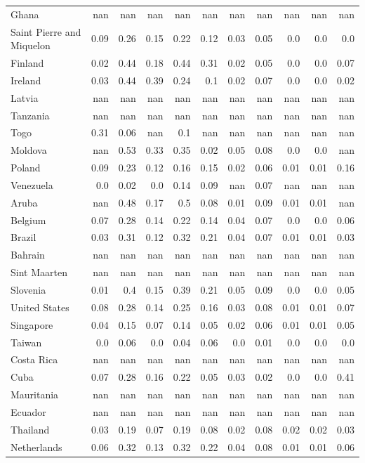 \documentclass[11pt]{article}
\begin{document}
\begin{center}
\begin{longtable}{|p{70pt}|r|r|r|r|r|r|r|r|r|r|}
Ghana& nan& nan& nan& nan& nan& nan& nan& nan& nan& nan\\
Saint Pierre and Miquelon& 0.09& 0.26& 0.15& 0.22& 0.12& 0.03& 0.05& 0.0& 0.0& 0.0\\
Finland& 0.02& 0.44& 0.18& 0.44& 0.31& 0.02& 0.05& 0.0& 0.0& 0.07\\
Ireland& 0.03& 0.44& 0.39& 0.24& 0.1& 0.02& 0.07& 0.0& 0.0& 0.02\\
Latvia& nan& nan& nan& nan& nan& nan& nan& nan& nan& nan\\
Tanzania& nan& nan& nan& nan& nan& nan& nan& nan& nan& nan\\
Togo& 0.31& 0.06& nan& 0.1& nan& nan& nan& nan& nan& nan\\
Moldova& nan& 0.53& 0.33& 0.35& 0.02& 0.05& 0.08& 0.0& 0.0& nan\\
Poland& 0.09& 0.23& 0.12& 0.16& 0.15& 0.02& 0.06& 0.01& 0.01& 0.16\\
Venezuela& 0.0& 0.02& 0.0& 0.14& 0.09& nan& 0.07& nan& nan& nan\\
Aruba& nan& 0.48& 0.17& 0.5& 0.08& 0.01& 0.09& 0.01& 0.01& nan\\
Belgium& 0.07& 0.28& 0.14& 0.22& 0.14& 0.04& 0.07& 0.0& 0.0& 0.06\\
Brazil& 0.03& 0.31& 0.12& 0.32& 0.21& 0.04& 0.07& 0.01& 0.01& 0.03\\
Bahrain& nan& nan& nan& nan& nan& nan& nan& nan& nan& nan\\
Sint Maarten& nan& nan& nan& nan& nan& nan& nan& nan& nan& nan\\
Slovenia& 0.01& 0.4& 0.15& 0.39& 0.21& 0.05& 0.09& 0.0& 0.0& 0.05\\
United States& 0.08& 0.28& 0.14& 0.25& 0.16& 0.03& 0.08& 0.01& 0.01& 0.07\\
Singapore& 0.04& 0.15& 0.07& 0.14& 0.05& 0.02& 0.06& 0.01& 0.01& 0.05\\
Taiwan& 0.0& 0.06& 0.0& 0.04& 0.06& 0.0& 0.01& 0.0& 0.0& 0.0\\
Costa Rica& nan& nan& nan& nan& nan& nan& nan& nan& nan& nan\\
Cuba& 0.07& 0.28& 0.16& 0.22& 0.05& 0.03& 0.02& 0.0& 0.0& 0.41\\
Mauritania& nan& nan& nan& nan& nan& nan& nan& nan& nan& nan\\
Ecuador& nan& nan& nan& nan& nan& nan& nan& nan& nan& nan\\
Thailand& 0.03& 0.19& 0.07& 0.19& 0.08& 0.02& 0.08& 0.02& 0.02& 0.03\\
Netherlands& 0.06& 0.32& 0.13& 0.32& 0.22& 0.04& 0.08& 0.01& 0.01& 0.06\\

\end{longtable}
\end{center}
\end{document}
